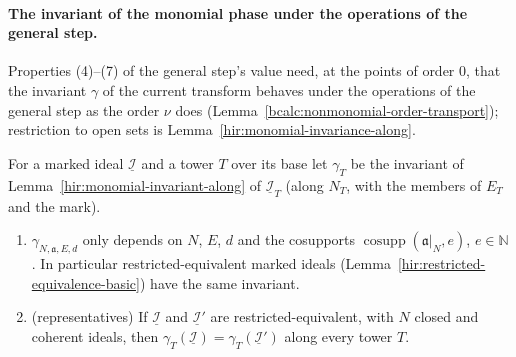 \paragraph{The invariant of the monomial phase under the operations of the general step.} Properties (4)--(7) of the general step's value need, at the
points of order \(0\), that the invariant \(\gamma\) of the current transform behaves under the operations of the general step as the order \(\nu\) does
(Lemma~\ref{bcalc:nonmonomial-order-transport}); restriction to open sets is Lemma~\ref{hir:monomial-invariance-along}.

\begin{lemma}
\label{bcalc:nonmonomial-order-monomial-transport}
\mixedleanok
For a marked ideal \(\underline{\mathcal I}\) and a tower \(T\) over its base let \(\gamma_T\) be the invariant of Lemma~\ref{hir:monomial-invariant-along} of
\(\underline{\mathcal I}_T\) (along \(N_T\), with the members of \(E_T\) and the mark).
\begin{enumerate}
\item \(\gamma_{N,\mathfrak a,E,d}\) only depends on \(N\), \(E\), \(d\) and the cosupports \(\operatorname{cosupp}(\mathfrak a|_N,e)\), \(e\in\mathbb N\). In particular restricted-equivalent
marked ideals (Lemma~\ref{hir:restricted-equivalence-basic}) have the same invariant.
\item (representatives) If \(\underline{\mathcal I}\) and \(\underline{\mathcal I}'\) are restricted-equivalent, with \(N\) closed and coherent ideals, then
\(\gamma_T(\underline{\mathcal I})=\gamma_T(\underline{\mathcal I}')\) along every tower \(T\).

\end{enumerate}
\end{lemma}
